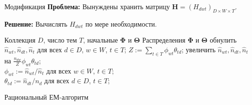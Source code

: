 \documentclass[unicode,9pt, pdf]{beamer}
\begin{document}
\begin{frame}{Модификация}
\textbf{Проблема:} Вынуждены хранить матрицу $\mathbf{H} = (H_{d w t})_{D \times W \times T}$.\\

\vspace{0.2 cm}

\textbf{Решение:} Вычислять $H_{d w t}$ по мере необходимости.

\begin{algorithm}[H]
\begin{algorithmic}[1]
\REQUIRE Коллекция $D$, число тем $T$, начальные $\mathbf{\Phi}$ и $\mathbf{\Theta}$
\ENSURE Распределения $\mathbf{\Phi}$ и $\mathbf{\Theta}$
\REPEAT
\STATE обнулить $\hat{n}_{w t}, \hat{n}_{d t}, \hat{n}_t$ для всех $d \in D$, $w \in W$, $t \in T$;
\STATE $Z:=\sum_{t \in T} \phi_{w t} \theta_{t d}$;
\STATE увеличить $\hat{n}_{w t}, \hat{n}_{d t}, \hat{n}_t$ на $\frac{n_{d w}}{Z}\phi_{w t} \theta_{t d}$;
\ENDFOR
\ENDFOR\\

$\phi_{w t} := \hat{n}_{w t}/\hat{n}_t$ для всех $w \in W$, $t \in T$;\\
$\theta_{t d} := \hat{n}_{d t}/n_d$ для всех $d \in D$, $t \in T$;
\end{algorithmic}
\caption{Рациональный ЕМ-алгоритм}
\label{alg:seq}
\end{algorithm}
\end{frame}
\end{document}
